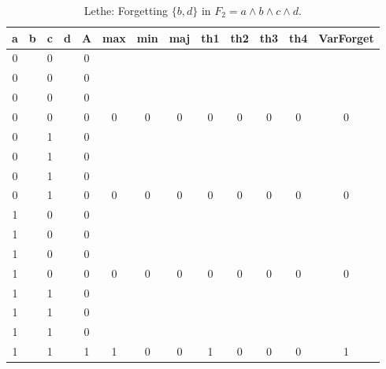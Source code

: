 \begin{table}[!tb]
    \centering
    \begin{tabular}{|c|c|c|c|c|c|c|c|c|c|c|c|c|}
        \hline
        \textbf{a} & \textbf{b} & \textbf{c} & \textbf{d} & \textbf{A} & \textbf{max} & \textbf{min} & \textbf{maj} & \textbf{th1} & \textbf{th2} & \textbf{th3} & \textbf{th4} & \textbf{VarForget} \\ \hline
        \rowcolor{gray!40} 0 &  & 0 &  & 0 &  &  &  &  &  &  &  &  \\ \hline
        \rowcolor{gray!40} 0 &  & 0 &  & 0 &  &  &  &  &  &  &  &  \\ \hline
        \rowcolor{gray!40} 0 &  & 0 &  & 0 &  &  &  &  &  &  &  &  \\ \hline
        \rowcolor{gray!40} 0 &  & 0 &  & 0 & 0 & 0 & 0 & 0 & 0 & 0 & 0 & 0 \\ \hline
        \rowcolor{blue!40} 0 &  & 1 &  & 0 &  &  &  &  &  &  &  &  \\ \hline
        \rowcolor{blue!40} 0 &  & 1 &  & 0 &  &  &  &  &  &  &  &  \\ \hline
        \rowcolor{blue!40} 0 &  & 1 &  & 0 &  &  &  &  &  &  &  &  \\ \hline
        \rowcolor{blue!40} 0 &  & 1 &  & 0 & 0 & 0 & 0 & 0 & 0 & 0 & 0 & 0 \\ \hline
        \rowcolor{red!40} 1 &  & 0 &  & 0 &  &  &  &  &  &  &  &  \\ \hline
        \rowcolor{red!40} 1 &  & 0 &  & 0 &  &  &  &  &  &  &  &  \\ \hline
        \rowcolor{red!40} 1 &  & 0 &  & 0 &  &  &  &  &  &  &  &  \\ \hline
        \rowcolor{red!40} 1 &  & 0 &  & 0 & 0 & 0 & 0 & 0 & 0 & 0 & 0 & 0 \\ \hline
        \rowcolor{green!40} 1 &  & 1 &  & 0 &  &  &  &  &  &  &  &  \\ \hline
        \rowcolor{green!40} 1 &  & 1 &  & 0 &  &  &  &  &  &  &  &  \\ \hline
        \rowcolor{green!40} 1 &  & 1 &  & 0 &  &  &  &  &  &  &  &  \\ \hline
        \rowcolor{green!40} 1 &  & 1 &  & 1 & 1 & 0 & 0 & 1 & 0 & 0 & 0 & 1 \\ \hline
    \end{tabular}
    \caption{Lethe: Forgetting $\{b, d\}$ in $F_{2} = a \land b \land c \land d$.}
    \label{tab:lethe-F2-bd}
\end{table}
